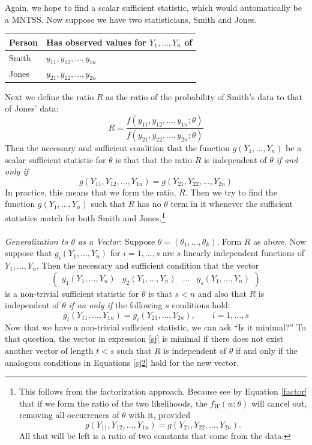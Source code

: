 \documentclass[a4paper,12pt]{scrartcl}
\begin{document}
Again, we hope to find a scalar sufficient statistic, which would
automatically be a MNTSS. Now suppose we have two statisticians, 
Smith and Jones. 
\begin{center}
\begin{tabular}{ l | l}
   Person & Has observed values for $Y_1, \ldots, Y_n$ of \\ \hline 
   Smith & $y_{11}, y_{12}, \ldots, y_{1n}$ \\
   Jones & $y_{21}, y_{22}, \ldots, y_{2n}$ 
\end{tabular}
\end{center}
Next we define the ratio $R$ as the ratio of the probability of 
Smith's data to that of Jones' data:
   \[ R = \frac{f(y_{11}, y_{12}, \ldots, y_{1n}; \theta)}{ f(
      y_{21}, y_{22}, \ldots, y_{2n}; \theta)}\]
Then the necessary and sufficient condition that the function
$g(Y_1, \ldots, Y_n)$ be a scalar sufficient statistic for $\theta$
is that that the ratio $R$ is independent of $\theta$ 
\emph{if and only if}
   \[ g(Y_{11}, Y_{12}, \ldots, Y_{1n})
      =  g(Y_{21}, Y_{22}, \ldots, Y_{2n}) \]
In practice, this means that we form the ratio, $R$. Then we try to
find the function $g(Y_1,\ldots, Y_n)$ such that $R$ has no
$\theta$ term in it whenever the sufficient statistics match for 
both Smith and Jones.\footnote{
This follows from the factorization
approach. Because see by Equation \ref{factor} that if we form 
the ratio of the two likelihoods, the $f_W(w;\theta)$ will cancel 
out, removing all occurrences of $\theta$ with it, provided 
   \[ g(Y_{11}, Y_{12}, \ldots, Y_{1n})
      =  g(Y_{21}, Y_{22}, \ldots, Y_{2n}). \]
All that will be left is a ratio of two constants that come from 
the data.}
\\
\\
{\sl Generalization to $\theta$ as a Vector}: Suppose 
$\theta = (\theta_1, \ldots, \theta_k)$. Form $R$ as above. 
Now suppose that $g_i(Y_1,  \ldots, Y_n)$ for $i=1, \ldots, s$
are $s$ linearly independent functions of $Y_1, \ldots, Y_n$. 
Then the necessary and sufficient condition that the vector 
\begin{equation}
\label{sj}
 \begin{pmatrix} g_1(Y_1, \ldots, Y_n) & g_2(Y_1, \ldots, Y_n) & \ldots
      & g_s(Y_1, \ldots, Y_n) \end{pmatrix}
\end{equation}
is a non-trivial sufficient statistic for $\theta$ is that $s<n$
and also that $R$ is independent of $\theta$ \emph{if an only if} 
the following $s$ conditions hold:
\begin{equation}
   \label{sj2}
   g_i(Y_{11}, \ldots, Y_{1n}) =  g_i(Y_{21}, \ldots, Y_{2n}), 
      \qquad i = 1, \ldots,s 
\end{equation}
Now that we have a non-trivial sufficient statistic, we can ask ``Is
it minimal?'' To that question, the vector in expression \ref{sj} is 
minimal if there does not exist another vector of length $t<s$ 
such that $R$ is independent of $\theta$ if and only if the 
analogous conditions in Equations \ref{sj2} hold for the new vector.
   
\end{document}
